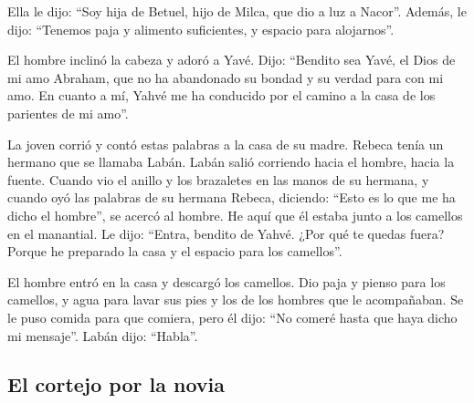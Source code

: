 \begin{paracol}{2}
 Ella le dijo: ``Soy hija de Betuel, hijo de Milca, que
dio a luz a Nacor''.  Además, le dijo: ``Tenemos paja y
alimento suficientes, y espacio para alojarnos''.

 El hombre inclinó la cabeza y adoró a Yavé.
 Dijo: ``Bendito sea Yavé, el Dios de mi amo Abraham, que
no ha abandonado su bondad y su verdad para con mi amo. En cuanto a mí,
Yahvé me ha conducido por el camino a la casa de los parientes de mi
amo''.

 La joven corrió y contó estas palabras a la casa de su
madre.  Rebeca tenía un hermano que se llamaba Labán.
Labán salió corriendo hacia el hombre, hacia la fuente. 
Cuando vio el anillo y los brazaletes en las manos de su hermana, y
cuando oyó las palabras de su hermana Rebeca, diciendo: ``Esto es lo que
me ha dicho el hombre'', se acercó al hombre. He aquí que él estaba
junto a los camellos en el manantial.  Le dijo: ``Entra,
bendito de Yahvé. ¿Por qué te quedas fuera? Porque he preparado la casa
y el espacio para los camellos''.

 El hombre entró en la casa y descargó los camellos. Dio
paja y pienso para los camellos, y agua para lavar sus pies y los de los
hombres que le acompañaban.  Se le puso comida para que
comiera, pero él dijo: ``No comeré hasta que haya dicho mi mensaje''.
Labán dijo: ``Habla''.

\hypertarget{el-cortejo-por-la-novia}{%
\subsection{El cortejo por la novia}\label{el-cortejo-por-la-novia}}


\end{paracol}
